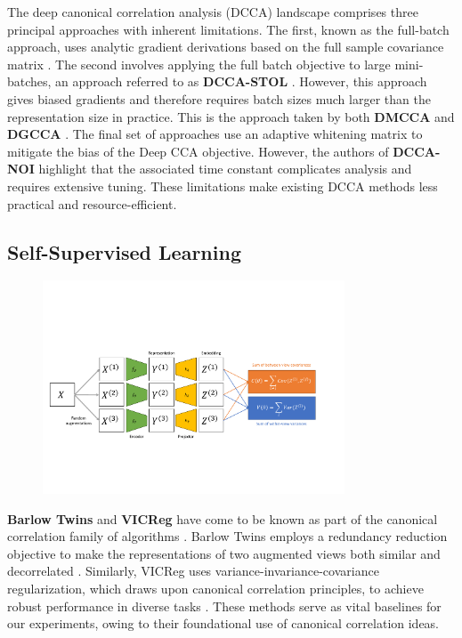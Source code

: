 The deep canonical correlation analysis (DCCA) landscape comprises three principal approaches with inherent limitations. The first, known as the full-batch approach, uses analytic gradient derivations based on the full sample covariance matrix \citep{andrew2013deep}.
The second involves applying the full batch objective to large mini-batches, an approach referred to as \textbf{DCCA-STOL} \citep{wang2015unsupervised}. However, this approach gives biased gradients and therefore requires batch sizes much larger than the representation size in practice. This is the approach taken by both \textbf{DMCCA} \citep{somandepalli2019multimodal} and \textbf{DGCCA} \citep{benton2017deep} . The final set of approaches use an adaptive whitening matrix \citep{wang2015stochastic, chang2018scalable} to mitigate the bias of the Deep CCA objective. However, the authors of \textbf{DCCA-NOI} highlight that the associated time constant complicates analysis and requires extensive tuning. These limitations make existing DCCA methods less practical and resource-efficient.

\subsection{Self-Supervised Learning}

\begin{figure}
    \centering
    \includegraphics[width=0.8\textwidth]{figures/ssl_schematic}
\end{figure}

\textbf{Barlow Twins} and \textbf{VICReg} have come to be known as part of the canonical correlation family of algorithms \citep{balestriero2023cookbook}. Barlow Twins employs a redundancy reduction objective to make the representations of two augmented views both similar and decorrelated \citep{zbontar2021barlow}. Similarly, VICReg uses variance-invariance-covariance regularization, which draws upon canonical correlation principles, to achieve robust performance in diverse tasks \citep{bardes2021vicreg}. These methods serve as vital baselines for our experiments, owing to their foundational use of canonical correlation ideas.

